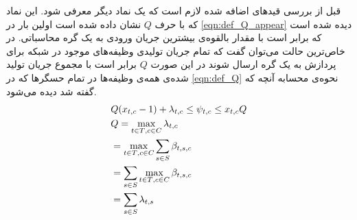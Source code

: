 	قبل از بررسی قیدهای اضافه شده لازم است که یک نماد دیگر معرفی شود. این نماد که با حرف $Q$ نشان داده شده است اولین بار در \cref{eqn:def_Q_appear} دیده شده است که برابر است با مقدار بالقوه‌ی بیشترین جریان ورودی به یک گره محاسباتی. در خاص‌ترین حالت می‌توان گفت که تمام جریان تولیدی وظیفه‌های موجود در شبکه برای پردازش به یک گره ارسال شوند در این صورت $Q$ برابر است با مجموع جریان تولید شده‌ی همه‌ی وظیفه‌ها در تمام حسگرها که در \cref{eqn:def_Q} نحوه‌ی محسابه آنچه که گفته شد دیده می‌شود. 
\begin{subequations}
	\begin{align}	
		&Q(x_{t,c}-1)+\lambda_{t,c} \leq \psi_{t,c} \leq x_{t,c}Q \label{eqn:def_Q_appear}\\
		&\notag Q = \max_{{t \in T},{c \in C}} \lambda_{t,c} \\
		&\notag =\max_{{t \in T},{c \in C}} \sum_{s \in S}\beta_{t,s,c} \\
		&\notag =\sum_{s\in S} \max_{{t \in T},{c \in C}} \beta_{t,s,c} \\
		&=\sum_{s \in S}\lambda_{t,s} \label{eqn:def_Q}
	\end{align}
\end{subequations}

